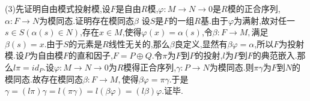 \documentclass[b5paper]{ctexart}
\begin{document}
(3)先证明自由模式投射模,设$F$是自由$R$模,$\varphi:M\rightarrow N\rightarrow 0$是$R$模的正合序列,$\alpha:F\rightarrow N$为模同态.证明存在模同态$\beta$
设$S$是$F$的一组$R$基.由于$\varphi$为满射,故对任一$s\in S(\alpha(s)\in N)$,存在$x\in M$,使得$\varphi(x)=\alpha(s)$,令$\beta:F\rightarrow M,$满足$\beta(s)=x$.由于$S$的元素是$R$线性无关的,那么$\beta$良定义,显然有$\beta\varphi=\alpha$,所以$F$为投射模.设$P$为自由模$F$的直和因子,$F=P\oplus Q.$令$\pi$为$F$到$P$的投射,$l$为$P$到$F$的典范嵌入.那么$l\pi=id_P.$设$\varphi:M\rightarrow N\rightarrow 0$为$R$模得正合序列,$\gamma:P\rightarrow N$为模同态.则$\pi\gamma$为$F$到$N$的模同态.故存在模同态$\beta:F\rightarrow M,$使得$\beta\varphi=\pi\gamma.$于是$\gamma=(l\pi)\gamma=l(\pi\gamma)=l(\beta\varphi)=(l\beta)\varphi.$证毕.
\end{document}
